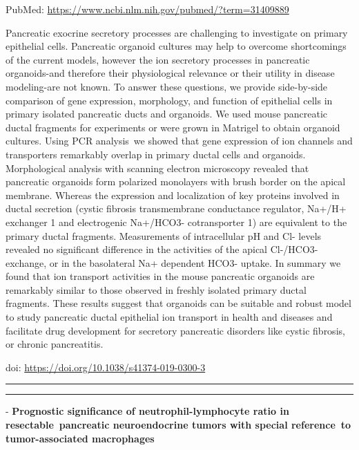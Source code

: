 \documentclass[]{article}
\begin{document}
PubMed: \url{https://www.ncbi.nlm.nih.gov/pubmed/?term=31409889}

Pancreatic exocrine secretory processes are challenging to investigate
on primary epithelial cells. Pancreatic organoid cultures may help to
overcome shortcomings of the current models, however the ion secretory
processes in pancreatic organoids-and therefore their physiological
relevance or their utility in disease modeling-are not known. To answer
these questions, we provide side-by-side comparison of gene expression,
morphology, and function of epithelial cells in primary isolated
pancreatic ducts and organoids. We used mouse pancreatic ductal
fragments for experiments or were grown in Matrigel to obtain organoid
cultures. Using PCR analysis~we showed that gene expression of ion
channels and transporters remarkably overlap in primary ductal cells and
organoids. Morphological analysis with scanning electron microscopy
revealed that pancreatic organoids form polarized monolayers with brush
border on the apical membrane. Whereas the expression and localization
of key proteins involved in ductal secretion (cystic fibrosis
transmembrane conductance regulator, Na+/H+ exchanger 1 and electrogenic
Na+/HCO3- cotransporter 1) are equivalent to the primary ductal
fragments. Measurements of intracellular pH and Cl- levels revealed no
significant difference in the activities of the apical Cl-/HCO3-
exchange, or in the basolateral Na+ dependent HCO3- uptake. In summary
we found that ion transport activities in the mouse pancreatic organoids
are remarkably similar to those observed in freshly isolated primary
ductal fragments. These results suggest that organoids can be suitable
and robust model to study pancreatic ductal epithelial ion transport in
health and diseases and facilitate drug development for secretory
pancreatic disorders like cystic fibrosis, or chronic pancreatitis.

doi: \url{https://doi.org/10.1038/s41374-019-0300-3}

{}

{}

\begin{center}\rule{0.5\linewidth}{\linethickness}\end{center}

\begin{center}\rule{0.5\linewidth}{\linethickness}\end{center}

 - \textbf{Prognostic significance of neutrophil-lymphocyte ratio in
resectable~pancreatic neuroendocrine tumors with special reference~to
tumor-associated macrophages}
\end{document}
